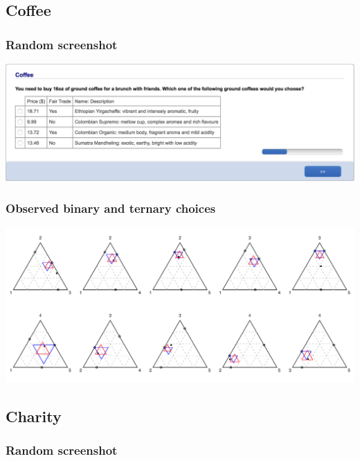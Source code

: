 \documentclass[11pt,letter]{article}
\begin{document}
\pagebreak

\subsection*{Coffee}



\subsubsection*{Random screenshot}

\includegraphics[width=15cm]{Population_study_design/screenshot_Coffee.png}

\subsubsection*{Observed binary and ternary choices}

\includegraphics[width=15cm]{./Population_study_data/Simplexes/Coffee.pdf}

\pagebreak

\subsection*{Charity}



\subsubsection*{Random screenshot}
\end{document}
